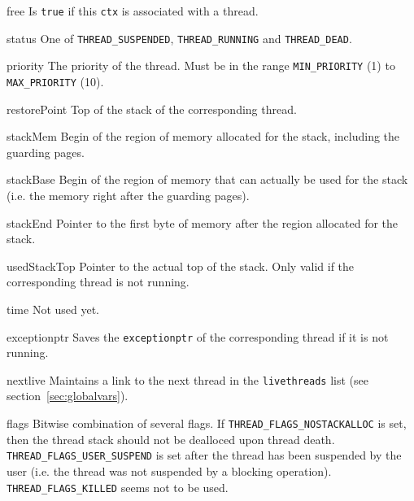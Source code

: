 \documentclass[twocolumn,a4paper]{article}      %
\newcommand{\structdesclabel}[1]{\mbox{\texttt{#1}}\hfil}
\newenvironment{structdesc}
    {\begin{list}{}%
           {\renewcommand{\makelabel}{\structdesclabel}%
           }%
    }%
    {\end{list}}
\begin{document}
\begin{structdesc}

\item[free] Is \texttt{true} if this \texttt{ctx} is associated with a thread.

\item[status] One of \texttt{THREAD\_SUSPENDED}, \texttt{THREAD\_RUNNING} and
    \texttt{THREAD\_DEAD}.

\item[priority] The priority of the thread. Must be in the range \texttt{MIN\_PRIORITY} (1) to
    \texttt{MAX\_PRIORITY} (10).

\item[restorePoint] Top of the stack of the corresponding thread.

\item[stackMem] Begin of the region of memory allocated for the stack, including the
    guarding pages.

\item[stackBase] Begin of the region of memory that can actually be used for the stack (i.e.
    the memory right after the guarding pages).

\item[stackEnd] Pointer to the first byte of memory after the region allocated for the stack.

\item[usedStackTop] Pointer to the actual top of the stack. Only valid if the corresponding
    thread is not running.

\item[time] Not used yet.

\item[exceptionptr] Saves the \texttt{exceptionptr} of the corresponding thread if it is
    not running.

\item[nextlive] Maintains a link to the next thread in the \texttt{livethreads} list
    (see section~\ref{sec:globalvars}).

\item[flags] Bitwise combination of several flags. If \texttt{THREAD\_FLAGS\_NOSTACKALLOC}
    is set, then the thread stack should not be dealloced upon thread death.
    \texttt{THREAD\_FLAGS\_USER\_SUSPEND} is set after the thread has been suspended by the user
    (i.e. the thread was not suspended by a blocking operation). \texttt{THREAD\_FLAGS\_KILLED}
    seems not to be used.

\end{structdesc}
\end{document}
